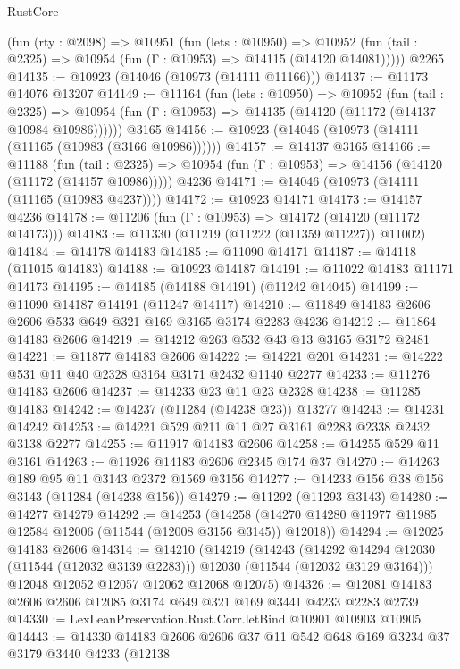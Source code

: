 \begin{lexlean}{RustCore}
\begin{coremodule}
    (fun (rty : @2098) =>
    @10951
      (fun (lets : @10950) =>
      @10952 (fun (tail : @2325) => @10954 (fun (Γ : @10953) => @14115 (@14120 @14081)))))
    @2265
@14135 := @10923 (@14046 (@10973 (@14111 @11166)))
@14137 := @11173 @14076 @13207
@14149 := @11164
    (fun (lets : @10950) =>
    @10952
      (fun (tail : @2325) =>
      @10954 (fun (Γ : @10953) => @14135 (@14120 (@11172 (@14137 @10984 @10986))))))
    @3165
@14156 := @10923 (@14046 (@10973 (@14111 (@11165 (@10983 (@3166 @10986))))))
@14157 := @14137 @3165
@14166 := @11188
    (fun (tail : @2325) => @10954 (fun (Γ : @10953) => @14156 (@14120 (@11172 (@14157 @10986)))))
    @4236
@14171 := @14046 (@10973 (@14111 (@11165 (@10983 @4237))))
@14172 := @10923 @14171
@14173 := @14157 @4236
@14178 := @11206 (fun (Γ : @10953) => @14172 (@14120 (@11172 @14173)))
@14183 := @11330 (@11219 (@11222 (@11359 @11227)) @11002)
@14184 := @14178 @14183
@14185 := @11090 @14171
@14187 := @14118 (@11015 @14183)
@14188 := @10923 @14187
@14191 := @11022 @14183 @11171 @14173
@14195 := @14185 (@14188 @14191) (@11242 @14045)
@14199 := @11090 @14187 @14191 (@11247 @14117)
@14210 := @11849 @14183 @2606 @2606 @533 @649 @321 @169 @3165 @3174 @2283 @4236
@14212 := @11864 @14183 @2606
@14219 := @14212 @263 @532 @43 @13 @3165 @3172 @2481
@14221 := @11877 @14183 @2606
@14222 := @14221 @201
@14231 := @14222 @531 @11 @40 @2328 @3164 @3171 @2432 @1140 @2277
@14233 := @11276 @14183 @2606
@14237 := @14233 @23 @11 @23 @2328
@14238 := @11285 @14183
@14242 := @14237 (@11284 (@14238 @23)) @13277
@14243 := @14231 @14242
@14253 := @14221 @529 @211 @11 @27 @3161 @2283 @2338 @2432 @3138 @2277
@14255 := @11917 @14183 @2606
@14258 := @14255 @529 @11 @3161
@14263 := @11926 @14183 @2606 @2345 @174 @37
@14270 := @14263 @189 @95 @11 @3143 @2372 @1569 @3156
@14277 := @14233 @156 @38 @156 @3143 (@11284 (@14238 @156))
@14279 := @11292 (@11293 @3143)
@14280 := @14277 @14279
@14292 := @14253
    (@14258 (@14270 @14280 @11977 @11985 @12584 @12006 (@11544 (@12008 @3156 @3145)) @12018))
@14294 := @12025 @14183 @2606
@14314 := @14210
    (@14219
      (@14243
        (@14292 @14294 @12030 (@11544 (@12032 @3139 @2283)))
        @12030
        (@11544 (@12032 @3129 @3164)))
      @12048
      @12052
      @12057
      @12062
      @12068
      @12075)
@14326 := @12081 @14183 @2606 @2606 @12085 @3174 @649 @321 @169 @3441 @4233 @2283 @2739
@14330 := LexLeanPreservation.Rust.Corr.letBind @10901 @10903 @10905
@14443 := @14330
    @14183
    @2606
    @2606
    @37
    @11
    @542
    @648
    @169
    @3234
    @37
    @3179
    @3440
    @4233
    (@12138

\end{coremodule}
\end{lexlean}
